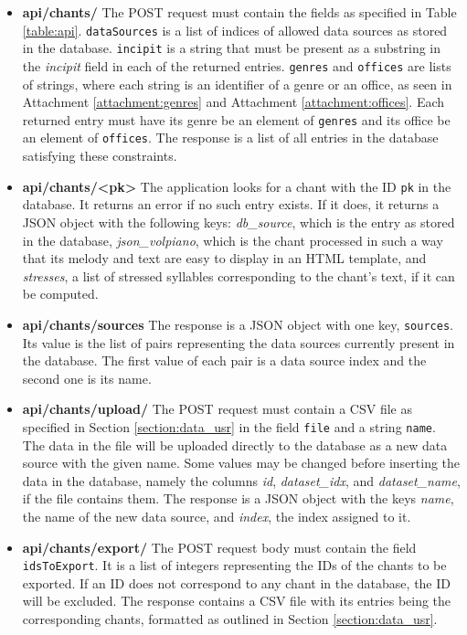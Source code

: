 \begin{itemize}

\item \textbf{api/chants/} The POST request must contain the fields as specified in Table \ref{table:api}. \verb|dataSources| is a list of indices of allowed data sources as stored
in the database. \verb|incipit| is a string that must be present as a substring in the \emph{incipit} field in each of the returned entries. \verb|genres| and \verb|offices|
are lists of strings, where each string is an identifier of a genre or an office, as seen in Attachment \ref{attachment:genres} and Attachment \ref{attachment:offices}.
Each returned entry must have its genre be an element of \verb|genres| and its office be an element of \verb|offices|. The response is a list of all entries in the
database satisfying these constraints.

\item \textbf{api/chants/\textless pk\textgreater} The application looks for a chant with the ID \verb|pk| in the database. It returns an error if no such entry exists. If it does,
it returns a JSON object with the following keys: \emph{db\_source}, which is the entry as stored in the database, \emph{json\_volpiano}, which is the chant processed in
such a way that its melody and text are easy to display in an HTML template, and \emph{stresses}, a list of stressed syllables corresponding to the chant's text, if it
can be computed.

\item \textbf{api/chants/sources} The response is a JSON object with one key, \verb|sources|. Its value is the list of pairs representing the data sources currently present in
the database. The first value of each pair is a data source index and the second one is its name.

\item \textbf{api/chants/upload/} The POST request must contain a CSV file as specified in Section \ref{section:data_usr} in the field \verb|file| and a string \verb|name|. The data in the file
will be uploaded directly to the database as a new data source with the given name. Some values may be changed before inserting the data in the database, namely the columns
\emph{id}, \emph{dataset\_idx}, and \emph{dataset\_name}, if the file contains them. The response is a JSON object with the keys \emph{name}, the name of the new data
source, and \emph{index}, the index assigned to it.

\item \textbf{api/chants/export/} The POST request body must contain the field \verb|idsTo|\verb|Export|. It is a list of integers representing the IDs of the chants to be exported. If
an ID does not correspond to any chant in the database, the ID will be excluded. The response contains a CSV file with its entries being the corresponding chants, formatted
as outlined in Section \ref{section:data_usr}.


\end{itemize}
